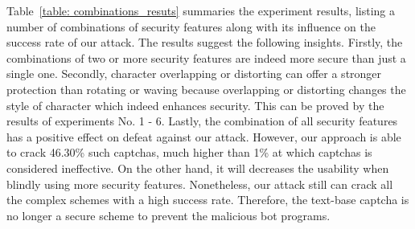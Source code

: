 Table~\ref{table: combinations_resuts} summaries the experiment results, listing a number of combinations of security features along with its influence on the success rate of our attack.
The results suggest the following insights.  Firstly, the combinations of two or more security features are indeed more secure than just a single one. Secondly, character overlapping or distorting can offer a stronger protection than rotating or waving because overlapping or distorting changes the style of character which indeed enhances security. This can be proved by the results of experiments No. 1 - 6. Lastly, the combination of all security features has a positive effect on defeat against our attack. However, our approach is able to crack 46.30\% such captchas, much higher than 1\% at which captchas is considered ineffective. On the other hand, it will decreases the usability when blindly using more security features. Nonetheless, our attack still can crack all the complex schemes with a high success rate. Therefore, the text-base captcha is no longer a secure scheme to prevent the malicious bot programs.
